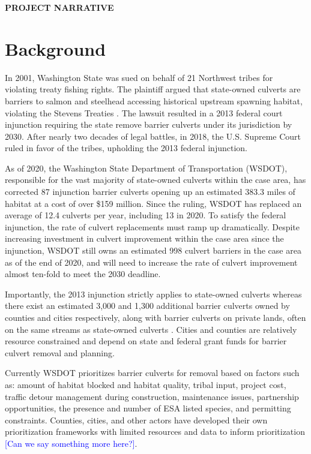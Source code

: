 \documentclass[12pt]{elsarticle}
\begin{document}
\begin{center} \textbf{PROJECT NARRATIVE} \end{center}


\section{Background} 
In 2001, Washington State was sued on behalf of 21 Northwest tribes for violating treaty fishing rights. The plaintiff argued that state-owned culverts are barriers to salmon and steelhead accessing historical upstream spawning habitat, violating the Stevens Treaties \citep{hickey2018highway}. The lawsuit resulted in a 2013 federal court injunction requiring the state remove barrier culverts under its jurisdiction by 2030. After nearly two decades of legal battles, in 2018, the U.S. Supreme Court ruled in favor of the tribes, upholding the 2013 federal injunction. 

As of 2020, the Washington State Department of Transportation (WSDOT), responsible for the vast majority of state-owned culverts within the case area, has corrected 87 injunction barrier culverts opening up an estimated 383.3 miles of habitat at a cost of over \$159 million. Since the ruling, WSDOT has replaced an average of 12.4 culverts per year, including 13 in 2020. To satisfy the federal injunction, the rate of culvert replacements must ramp up dramatically. Despite increasing investment in culvert improvement within the case area since the injunction, WSDOT still owns an estimated 998 culvert barriers in the case area as of the end of 2020, and will need to increase the rate of culvert improvement almost ten-fold to meet the 2030 deadline.  

Importantly, the 2013 injunction strictly applies to state-owned culverts whereas there exist an estimated 3,000 and 1,300 additional barrier culverts owned by counties and cities respectively, along with barrier culverts on private lands, often on the same streams as state-owned culverts \citep{brown2019coming}. Cities and counties are relatively resource constrained and depend on state and federal grant funds for barrier culvert removal and planning.

Currently WSDOT prioritizes barrier culverts for removal based on factors such as: amount of habitat blocked and habitat quality, tribal input, project cost, traffic detour management during construction, maintenance issues, partnership opportunities, the presence and number of ESA listed species, and permitting constraints. Counties, cities, and other actors have developed their own prioritization frameworks with limited resources and data to inform prioritization \textcolor{blue}{[Can we say something more here?]}. 
\end{document}
